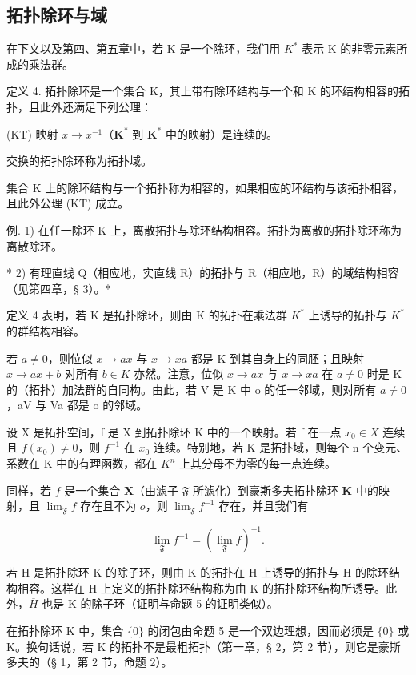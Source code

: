 \subsection{拓扑除环与域}

在下文以及第四、第五章中，若 K 是一个除环，我们用 \(K^{*}\) 表示 K 的非零元素所成的乘法群。

定义 4. 拓扑除环是一个集合 K，其上带有除环结构与一个和 K 的环结构相容的拓扑，且此外还满足下列公理：

(KT) 映射 \(x \to x^{-1}\)（\(\mathbf{K}^*\) 到 \(\mathbf{K}^*\) 中的映射）是连续的。

交换的拓扑除环称为拓扑域。

集合 K 上的除环结构与一个拓扑称为相容的，如果相应的环结构与该拓扑相容，且此外公理 (KT) 成立。

例. 1) 在任一除环 K 上，离散拓扑与除环结构相容。拓扑为离散的拓扑除环称为离散除环。

* 2) 有理直线 Q（相应地，实直线 R）的拓扑与 R（相应地，R）的域结构相容（见第四章，§ 3）。*

定义 4 表明，若 K 是拓扑除环，则由 K 的拓扑在乘法群 \(K^{*}\) 上诱导的拓扑与 \(K^{*}\) 的群结构相容。

若 \(a \neq 0\)，则位似 \(x \rightarrow ax\) 与 \(x \rightarrow xa\) 都是 K 到其自身上的同胚；且映射 \(x \rightarrow ax + b\) 对所有 \(b \in K\) 亦然。注意，位似 \(x \rightarrow ax\) 与 \(x \rightarrow xa\) 在 \(a \neq 0\) 时是 K 的（拓扑）加法群的自同构。由此，若 V 是 K 中 o 的任一邻域，则对所有 \(a \neq 0\)，aV 与 Va 都是 o 的邻域。

设 X 是拓扑空间，f 是 X 到拓扑除环 K 中的一个映射。若 f 在一点 \(x_{0} \in X\) 连续且 \(f(x_{0}) \neq 0\)，则 \(f^{-1}\) 在 \(x_{0}\) 连续。特别地，若 K 是拓扑域，则每个 n 个变元、系数在 K 中的有理函数，都在 \(K^{n}\) 上其分母不为零的每一点连续。

同样，若 \(f\) 是一个集合 \(\mathbf{X}\)（由滤子 \(\mathfrak{F}\) 所滤化）到豪斯多夫拓扑除环 \(\mathbf{K}\) 中的映射，且 \(\lim_{\mathfrak{F}} f\) 存在且不为 \(o\)，则 \(\lim_{\mathfrak{F}} f^{-1}\) 存在，并且我们有

\[
\lim _ {\mathfrak {F}} f ^ {- 1} = (\lim _ {\mathfrak {F}} f) ^ {- 1}.\tag{4}
\]

若 H 是拓扑除环 K 的除子环，则由 K 的拓扑在 H 上诱导的拓扑与 H 的除环结构相容。这样在 H 上定义的拓扑除环结构称为由 K 的拓扑除环结构所诱导。此外，\(\overline{H}\) 也是 K 的除子环（证明与命题 5 的证明类似）。

在拓扑除环 K 中，集合 \(\{0\}\) 的闭包由命题 5 是一个双边理想，因而必须是 \(\{0\}\) 或 K。换句话说，若 K 的拓扑不是最粗拓扑（第一章，§ 2，第 2 节），则它是豪斯多夫的（§ 1，第 2 节，命题 2）。

